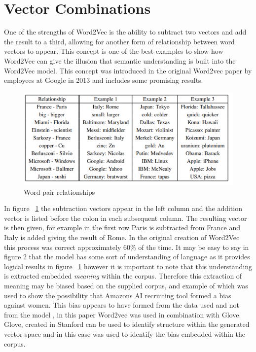 \section{Vector Combinations}
One of the strengths of Word2Vec is the ability to subtract two vectors and add the result to a third, allowing for another form of relationship between word vectors to appear. This concept is one of the best examples to show how Word2Vec can give the illusion that semantic understanding is built into the Word2Vec model. This concept was introduced in the original Word2vec paper by employees at Google in 2013 and includes some promising results.

\begin{figure}[h]
    \centering
    \includegraphics[width=\textwidth]{images/learned_relationships}
    \caption{Word pair relationships}
    \label{fig:table_relations}
\end{figure}

\noindent
In figure ~\ref{fig:table_relations} the subtraction vectors appear in the left column and the addition vector is listed before the colon in each subsequent column. The resulting vector is then given, for example in the first row Paris is subtracted from France and Italy is added giving the result of Rome. In the original creation of Word2Vec this process was correct approximately 60\% of the time. \cite{Mikolova} It may be easy to say in figure 2 that the model has some sort of understanding of language as it provides logical results in figure ~\ref{fig:table_relations} however it is important to note that this understanding is extracted embedded \textit{meaning} within the corpus. Therefore this extraction of meaning may be biased based on the supplied corpus, and example of which was used to show the possibility that Amazons AI recruiting tool formed a bias against women. This bias appears to have formed from the data used and not from the model \cite{Caliskan}, in this paper Word2vec was used in combination with Glove. Glove, created in Stanford can be used to identify structure within the generated vector space and in this case was used to identify the bias embedded within the corpus. \cite{Pennington}

